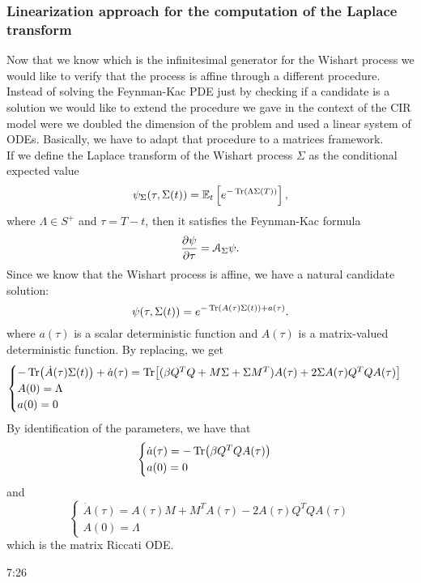 \subsubsection{Linearization approach for the computation of the Laplace transform}
Now that we know which is the infinitesimal generator for the Wishart process we would like to verify that the process is affine through a different procedure. Instead of solving the Feynman-Kac PDE just by checking if a candidate is a solution we would like to extend the procedure we gave in the context of the CIR model were we doubled the dimension of the problem and used a linear system of ODEs. Basically, we have to adapt that procedure to a matrices framework.\\
If we define the Laplace transform of the Wishart process $\Sigma$ as the conditional expected value
\begin{equation}
    \psi_{\Sigma}(\tau, \Sigma(t)) = \mathbb{E}_t\left[e^{-\Tr(\Lambda\Sigma(T))}\right],
\end{equation}
where $\Lambda\in S^+$ and $\tau = T-t$, then it satisfies the Feynman-Kac formula
\begin{equation}
    \pdv{\psi}{\tau} = \mathcal{A}_{\Sigma}\psi.
\end{equation}
Since we know that the Wishart process is affine, we have a natural candidate solution:
\begin{equation}
    \psi(\tau, \Sigma(t)) = e^{-\Tr(A(\tau)\Sigma(t))+ a(\tau)}.
\end{equation}
where $a(\tau)$ is a scalar deterministic function and $A(\tau)$ is a matrix-valued deterministic function. By replacing, we get
\begin{equation*}
    \begin{cases}
    -\Tr(\dot{A}(\tau)\Sigma(t)) + \dot{a}(\tau) = \Tr[(\beta Q^TQ + M\Sigma + \Sigma M^T)A(\tau) + 2\Sigma A(\tau)Q^TQA(\tau)] \\ %
    A(0) = \Lambda \\
    a(0) = 0
    \end{cases}
\end{equation*}
By identification of the parameters, we have that
\begin{equation*}
    \begin{cases}
        \dot{a}(\tau) = -\Tr(\beta Q^TQ A(\tau)) \\
        a(0) = 0
    \end{cases}
\end{equation*}
and
\begin{equation*}
    \begin{cases}
        \dot{A}(\tau) = A(\tau)M + M^TA(\tau) - 2A(\tau)Q^TQA(\tau) \\
        A(0) = \Lambda
    \end{cases}
\end{equation*}
which is the matrix Riccati ODE.

7:26
